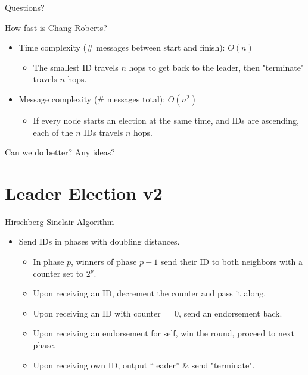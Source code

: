 \documentclass[aspectratio=169]{beamer}
\begin{document}
\begin{frame}{}
      \begin{center}
    {\color{sigma@mainblue} \LARGE Questions?}
  \end{center}
\end{frame} 

\begin{frame}{How fast is Chang-Roberts?}
    \begin{itemize}
        \item Time complexity (\# messages between start and finish): \pause $O(n)$
        \begin{itemize}
            \item The smallest ID travels $n$ hops to get back to the leader, then "terminate" travels $n$ hops.\pause
        \end{itemize}
        \item Message complexity (\# messages total): \pause $O(n^2)$
        \begin{itemize}
            \item If every node starts an election at the same time, and IDs are ascending, each of the $n$ IDs travels $n$ hops.
        \end{itemize}
    \end{itemize}
\end{frame}


\begin{frame}{Can we do better?}
    Any ideas?
\end{frame}

\section{Leader Election v2}

\begin{frame}{Hirschberg-Sinclair Algorithm}
    \begin{itemize}
        \item Send IDs in phases with doubling distances.
        \begin{itemize}
            \item In phase $p$, winners of phase $p - 1$ send their ID to both neighbors with a counter set to $2^p$.
            \item Upon receiving an ID, decrement the counter and pass it along.
            \item Upon receiving an ID with counter $= 0$, send an endorsement back.
            \item Upon receiving an endorsement for self, win the round, proceed to next phase.
            \item Upon receiving own ID, output “leader” \& send "terminate".
        \end{itemize}
    \end{itemize}
\end{frame}
\end{document}
